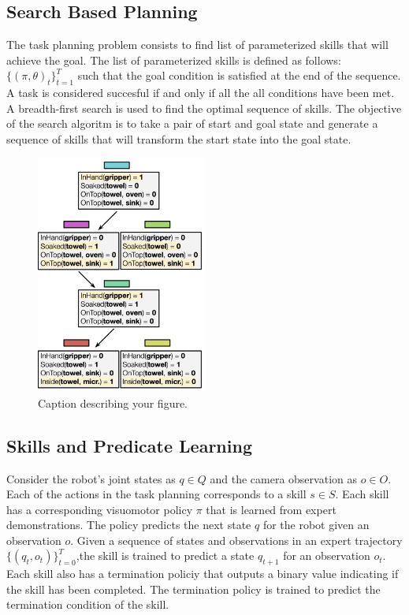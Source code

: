 \documentclass[
	a4paper, %
	10pt, %
	unnumberedsections, %
	twoside, %
]{LTJournalArticle}
\begin{document}
\subsection{Search Based Planning}
The task planning problem consists to find list of parameterized skills that will achieve the goal. The list of parameterized skills is
defined as follows: \(\{(\pi, \theta)_t\}^T_{t=1}\) such that the goal condition is satisfied at the end of the sequence. A task is considered
succesful if and only if all the all conditions have been met. A breadth-first search is used to find the optimal sequence of skills. The objective
of the search algoritm is to take a pair of start and goal state and generate a sequence of skills that will transform the start state into the goal state.
\begin{figure}[htb]
	\centering
	\includegraphics[width=0.5\textwidth]{figures/bfs_predicates.png}
	\caption{Caption describing your figure.}
	\label{fig:yourlabel}
  \end{figure}
  

\subsection{Skills and Predicate Learning}

Consider the robot's joint states as \(q \in Q\) and the camera observation as \(o \in O\). Each of the actions in the task planning corresponds
to a skill \(s \in S\). Each skill has a corresponding visuomotor policy \(\pi\) that is learned from expert demonstrations. The policy predicts the
next state \(q\) for the robot given an observation \(o\). Given a sequence of states and observations in an expert trajectory \(\{(q_t, o_t)\}^T_{t=0}\),the
skill is trained to predict a state \(q_{t+1}\) for an observation \(o_t\). Each skill also has a termination policiy that outputs a binary value indicating
if the skill has been completed. The termination policy is trained to predict the termination condition of the skill. 
\end{document}
